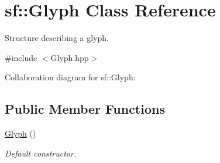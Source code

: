 \hypertarget{classsf_1_1_glyph}{}\section{sf\+:\+:Glyph Class Reference}
\label{classsf_1_1_glyph}


Structure describing a glyph.  




{\ttfamily \#include $<$Glyph.\+hpp$>$}



Collaboration diagram for sf\+:\+:Glyph\+:
\subsection*{Public Member Functions}
\begin{DoxyCompactItemize}
\item 
\mbox{\label{classsf_1_1_glyph_ab15cfc37eb7b40a94b3b3aedf934010b}} 
\hyperlink{classsf_1_1_glyph_ab15cfc37eb7b40a94b3b3aedf934010b}{Glyph} ()
\begin{DoxyCompactList}\small\item\em Default constructor. \end{DoxyCompactList}\end{DoxyCompactItemize}
